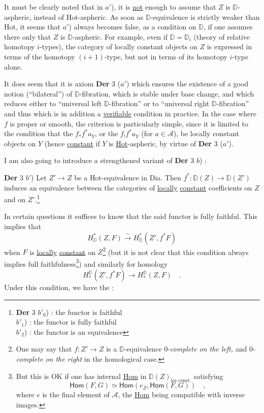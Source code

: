 \documentclass[11pt]{article}
\newcommand{\printedpage}[1]{\marginpar{\footnotesize p.~#1}}
\newcommand{\msp}[1]{\marginpar{\footnotesize [#1]}}
\newcommand{\Hot}{\textsf{Hot}}
\newcommand{\Dia}{\textsf{Dia}}
\newcommand{\Hom}{\textsf{Hom}}
\newcommand{\DD}{\mathbb{D}}
\begin{document}
It must be clearly noted that in $a'$), it is \underline{not} enough to assume that $Z$ is $\DD$-aspheric, instead of \Hot-aspheric. As soon as $\DD$-equivalence is strictly weaker than \Hot, it seems that $a'$) always becomes false, as a condition on $\DD$, if one assumes there only that $Z$ is $\DD$-aspheric. For example, even if $\DD = \DD_i$ (theory of relative homotopy $i$-types), the category
\msp{page 98}
of locally constant objects on $Z$ is expressed in terms of the homotopy $(i+1)$-type, but not in terms of its homotopy $i$-type alone.

It does seem that it is axiom \textbf{Der} 3 ($a'$) which ensures the existence of a good notion (``bilateral'') of $\DD$-fibration, which is stable under base change, and which reduces either
\printedpage{60}
to ``universal left $\DD$-fibration'' or to ``universal right $\DD$-fibration'' and thus which is in addition a \underline{verifiable} condition in practice. In the case where $f$ is proper or smooth, the criterion is particularly simple, since it is limited to the condition that the $f_* f^* a_Y$, or the $f_! f^* a_Y$ (for $a \in \mathcal{A}$), be locally constant objects on $Y$ (hence \underline{constant} if $Y$ is \underline{\underline{\Hot}}-aspheric, by virtue of \textbf{Der} 3 ($a'$). %

I am also going to introduce a strengthened variant of \textbf{Der} 3 $b$) :

\textbf{Der} 3 $b'$) Let $Z' \to Z$ be a \Hot-equivalence in \Dia. Then $f^* : \DD(Z) \to \DD(Z')$ induces an equivalence between the categories of \underline{locally} \underline{constant} coefficients on $Z$ and on $Z'$.\footnote[50]{\textbf{Der} 3 $b'_0$) : the functor is faithful\\
\hspace*{6em}$b'_1$) : the functor is fully faithful\\
\hspace*{6em}$b'_2$) : the functor is an equivalence} %

\msp{page 99}
In certain questions it suffices to know that the said functor is fully faithful. This implies that
\[
H^*_{\DD}(Z,F) \overset{\sim}{\longrightarrow} H^*_{\DD}(Z', f^*F)
\]
when $F$ is \underline{locally} \underline{constant} on $Z$\footnote[51]{One may say that $f : Z' \to Z$ is a $\DD$-equivalence 0-\textit{complete on the left,} and 0-\textit{complete on the right} in the homological case.} (but it is not clear that this condition always implies full faithfulness\footnote[52]{But this is OK if one has internal \underline{\Hom} in $\DD(Z)_{\mathrm{loc.const.}}$ satisfying
\[
\Hom(F,G) \simeq \Hom(e_Z, \underline{\Hom}(F,G)) \quad ,
\]
where $e$ is the final element of $\mathcal{A}$, the \underline{\Hom} being compatible with inverse images.}) and similarly for homology
\[
H_*^{\DD}(Z', f^*F) \longrightarrow H_*^{\DD}(Z,F) \quad .
\]
Under this condition, we have the :
\end{document}
